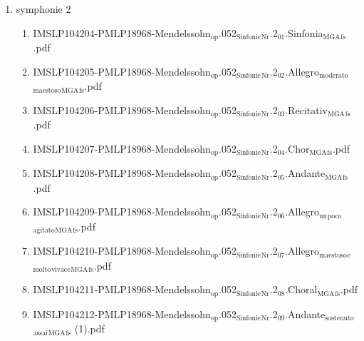 \documentclass[11pt]{article}
\begin{document}
\begin{enumerate}
\begin{enumerate}
\item symphonie 2
\label{sec-1-1-1-1-44-45-3-5}
\begin{enumerate}
\item IMSLP104204-PMLP18968-Mendelssohn$_{\text{op}}$.052$_{\text{Sinfonie}}$$_{\text{Nr}}$.2$_{\text{01}}$.Sinfonia$_{\text{MGA}}$$_{\text{fs}}$.pdf
\label{sec-1-1-1-1-44-45-3-5-1}

\item IMSLP104205-PMLP18968-Mendelssohn$_{\text{op}}$.052$_{\text{Sinfonie}}$$_{\text{Nr}}$.2$_{\text{02}}$.Allegro$_{\text{moderato}}$$_{\text{maestoso}}$$_{\text{MGA}}$$_{\text{fs}}$.pdf
\label{sec-1-1-1-1-44-45-3-5-2}

\item IMSLP104206-PMLP18968-Mendelssohn$_{\text{op}}$.052$_{\text{Sinfonie}}$$_{\text{Nr}}$.2$_{\text{03}}$.Recitativ$_{\text{MGA}}$$_{\text{fs}}$.pdf
\label{sec-1-1-1-1-44-45-3-5-3}

\item IMSLP104207-PMLP18968-Mendelssohn$_{\text{op}}$.052$_{\text{Sinfonie}}$$_{\text{Nr}}$.2$_{\text{04}}$.Chor$_{\text{MGA}}$$_{\text{fs}}$.pdf
\label{sec-1-1-1-1-44-45-3-5-4}

\item IMSLP104208-PMLP18968-Mendelssohn$_{\text{op}}$.052$_{\text{Sinfonie}}$$_{\text{Nr}}$.2$_{\text{05}}$.Andante$_{\text{MGA}}$$_{\text{fs}}$.pdf
\label{sec-1-1-1-1-44-45-3-5-5}

\item IMSLP104209-PMLP18968-Mendelssohn$_{\text{op}}$.052$_{\text{Sinfonie}}$$_{\text{Nr}}$.2$_{\text{06}}$.Allegro$_{\text{un}}$$_{\text{poco}}$$_{\text{agitato}}$$_{\text{MGA}}$$_{\text{fs}}$.pdf
\label{sec-1-1-1-1-44-45-3-5-6}

\item IMSLP104210-PMLP18968-Mendelssohn$_{\text{op}}$.052$_{\text{Sinfonie}}$$_{\text{Nr}}$.2$_{\text{07}}$.Allegro$_{\text{maestoso}}$$_{\text{e}}$$_{\text{molto}}$$_{\text{vivace}}$$_{\text{MGA}}$$_{\text{fs}}$.pdf
\label{sec-1-1-1-1-44-45-3-5-7}

\item IMSLP104211-PMLP18968-Mendelssohn$_{\text{op}}$.052$_{\text{Sinfonie}}$$_{\text{Nr}}$.2$_{\text{08}}$.Choral$_{\text{MGA}}$$_{\text{fs}}$.pdf
\label{sec-1-1-1-1-44-45-3-5-8}

\item IMSLP104212-PMLP18968-Mendelssohn$_{\text{op}}$.052$_{\text{Sinfonie}}$$_{\text{Nr}}$.2$_{\text{09}}$.Andante$_{\text{sostenuto}}$$_{\text{assai}}$$_{\text{MGA}}$$_{\text{fs}}$ (1).pdf
\label{sec-1-1-1-1-44-45-3-5-9}


\end{enumerate}
\end{enumerate}
\end{enumerate}
\end{document}
